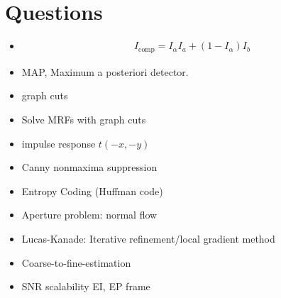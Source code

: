 \newpage
\chapter{Questions}
\begin{itemize}[leftmargin=2em]
	\item 
	\begin{gather*}
		I_{\text{comp}}=I_{\alpha}I_{a}+\left( 1-I_{\alpha} \right)I_b
	\end{gather*}
	\item MAP, Maximum a posteriori detector.
	\item graph cuts
	\item Solve MRFs with graph cuts
	\item impulse response $t(-x,-y)$
	\item Canny nonmaxima suppression
	\item Entropy Coding (Huffman code)
	\item Aperture problem: normal flow
	\item Lucas-Kanade: Iterative refinement/local gradient method
	\item Coarse-to-fine-estimation
	\item SNR scalability EI, EP frame
\end{itemize}
\vfill
